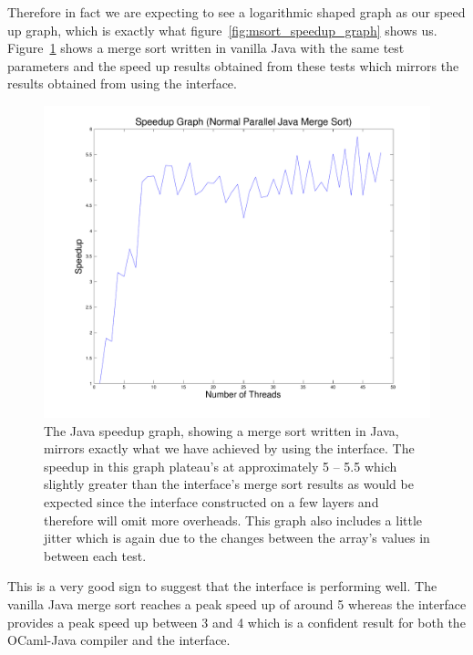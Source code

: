 \documentclass[12pt,twoside,notitlepage]{report}
\begin{document}
Therefore in fact we are expecting to see a logarithmic shaped graph as our speed up graph, which is exactly what figure~\ref{fig:msort_speedup_graph} shows us. Figure~\ref{fig:java_speedup_graph} shows a merge sort written in vanilla
Java\cite{web:washington} with the same test parameters and the speed up results obtained from these tests which mirrors the results obtained from using the interface.
\begin{figure}[h!]
\includegraphics[width=\linewidth]{java_speedup_graph}
\caption{The Java speedup graph, showing a merge sort written in Java, mirrors exactly what we have achieved by using the interface. The speedup in this graph plateau's at approximately 5 -- 5.5 which slightly greater than the
interface's merge sort results as would be expected since the interface constructed on a few layers and therefore will omit more overheads. This graph also includes a little jitter which is again due to the changes between the array's
values in between each test.}
\label{fig:java_speedup_graph}
\end{figure}
This is a very good sign to suggest that the interface is performing well. The vanilla Java merge sort reaches a peak speed up of around 5 whereas the interface provides a peak speed up between 3 and 4 which is a confident result for
both the OCaml-Java compiler and the interface. 
\end{document}
